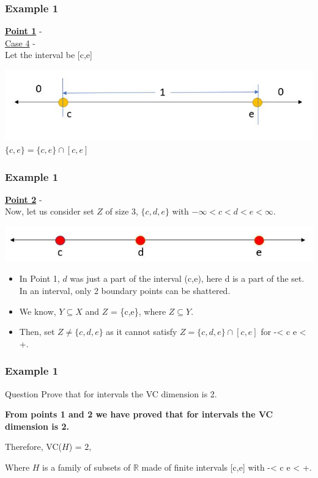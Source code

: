 \documentclass{beamer}
\begin{document}
\begin{frame}
\frametitle{Example 1}
\item \textbf{\underline{Point 1}} -\\
\underline{Case 4} - \\
Let the interval be [c,e]
\begin{center}
    \includegraphics[scale = 0.5]{figures/Capture5.JPG}\\
    $\{c,e\} = \{c,e\} \cap [c,e]$
\end{center}
\end{frame}


\begin{frame}
\frametitle{Example 1}
\item \textbf{\underline{Point 2}} -\\
Now, let us consider set $Z $ of size 3, $\{c,d,e\}$ with $-\infty < c < d < e < \infty $.\\
\begin{center}
    \includegraphics[scale = 0.5]{figures/Capture6.JPG}\\
\end{center}
\begin{itemize}
    \item <1-> In Point 1, $d$ was just a part of the interval (c,e), here d is a part of the set. In an interval, only 2 boundary points can be shattered.\\
    \item <2-> We know, $Y \subseteq X$ and $Z$ = \{c,e\}, where $Z \subseteq Y$.
    \item <3-> Then, set $Z \neq \{c,d,e\}$ as it cannot satisfy $Z = \{c, d, e\} \cap [c , e]$ for -\infty < c \leq e < +\infty.\\
\end{itemize}
\end{frame}

\begin{frame}
\frametitle{Example 1}
\begin{block}{Question}
Prove that for intervals the VC dimension is 2.
\end{block}
\item \textbf{From points 1 and 2 we have proved that for intervals the VC dimension is 2.}\\
\begin{center}
    Therefore, VC($H$) = $2$,\\
\end{center}
Where $H$ is a family of subsets of $\mathbb{R}$ made of finite intervals [c,e] with -\infty < c \leq e < +\infty.\\
\end{frame}
\end{document}
